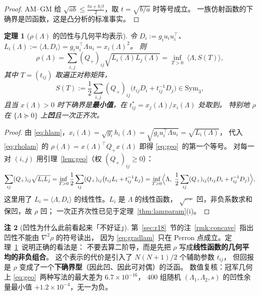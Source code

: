 \documentclass[UTF8,11pt]{ctexart}
\newtheorem{theorem}{定理}[section]
\theoremstyle{definition}
\newtheorem{remark}[theorem]{注}
\newcommand{\Lam}{\Lambda}
\begin{document}
\begin{proof}
AM--GM 给 $\sqrt{ab}\le\frac{ta+b/t}2$，取 $t=\sqrt{b/a}$ 时等号成立。
一族仿射函数的下确界是凹函数，这是凸分析的标准事实。
\end{proof}

\begin{theorem}[$\rho(\Lam)$ 的凹性与几何平均表示]\label{thm:geo}
令 $D_i:=g_iu_iu_i^\top$、$L_i(\Lam):=\langle\Lam,D_i\rangle=g_iu_i^\top\Lam u_i=x_i(\Lam)^2$。
则
\begin{equation}\label{eq:geo}
\rho(\Lam)=\sum_{i,j}(Q_+)_{ij}\sqrt{L_i(\Lam)L_j(\Lam)}
=\inf_{T>0}\ \langle\Lam,S(T)\rangle ,
\end{equation}
其中 $T=(t_{ij})$ 取遍正对称矩阵，
\begin{equation}\label{eq:ST}
S(T):=\frac12\sum_{i,j}(Q_+)_{ij}\bigl(t_{ij}D_i+t_{ij}^{-1}D_j\bigr)\in\mathrm{Sym}_3 ,
\end{equation}
且当 $x(\Lam)>0$ 时下确界是\textbf{最小值}，在 $t^*_{ij}=x_j(\Lam)/x_i(\Lam)$ 处取到。
特别地 $\rho$ 在 $\{\Lam\succeq0\}$ 上\textbf{凹}且一次正齐次。
\end{theorem}

\begin{proof}
由 \eqref{eq:hlam}，$x_i(\Lam)=\sqrt{g_i}h_i(\Lam)=\sqrt{g_iu_i^\top\Lam u_i}=\sqrt{L_i(\Lam)}$，
代入 \eqref{eq:rholam}~的 $\rho(\Lam)=x(\Lam)^\top Q_+x(\Lam)$ 即得 \eqref{eq:geo}~的第一个等号。
对每一对 $(i,j)$ 用引理~\ref{lem:geo}（权 $(Q_+)_{ij}\ge0$）：
\[
\sum_{ij}(Q_+)_{ij}\sqrt{L_iL_j}
=\inf_{T>0}\frac12\sum_{ij}(Q_+)_{ij}\bigl(t_{ij}L_i+t_{ij}^{-1}L_j\bigr)
=\inf_{T>0}\Bigl\langle\Lam,\ \frac12\sum_{ij}(Q_+)_{ij}(t_{ij}D_i+t_{ij}^{-1}D_j)\Bigr\rangle ,
\]
这里用了 $L_i=\langle\Lam,D_i\rangle$ 的线性性。$L_i$ 是 $\Lam$ 的线性函数，
$\sqrt{\cdot\,\cdot}$ 凹，非负系数求和保凹，故 $\rho$ 凹；
一次正齐次性已见于定理~\ref{thm:lamparam}(i)。
\end{proof}

\begin{remark}[凹性为什么此前看起来「不好证」]\label{rmk:concwhy}
第~\ref{sec:r18}~节的注~\ref{rmk:concave}~指出凹性不能由 $\nabla^2\rho$ 的符号读出，
因为 \eqref{eq:gradlam}~只在 Perron 点成立。定理~\ref{thm:geo}~说明正确的看法是：
不要去算二阶导，而是先把 $\rho$ 写成\textbf{线性函数的几何平均的非负组合}。
这个表示的代价是引入了 $N(N+1)/2$ 个辅助参数 $t_{ij}$，
但回报是 $\rho$ 变成了一个\textbf{下确界型}（因此凹、因此可对偶）的泛函。
数值复核：冠军几何上 \eqref{eq:geo}~两种写法的最大差为 $6.7\times10^{-16}$，
$400$ 组随机 $(\Lam_1,\Lam_2,s)$ 的凹性余量最小值 $+1.2\times10^{-4}$，无一为负。
\end{remark}
\end{document}
